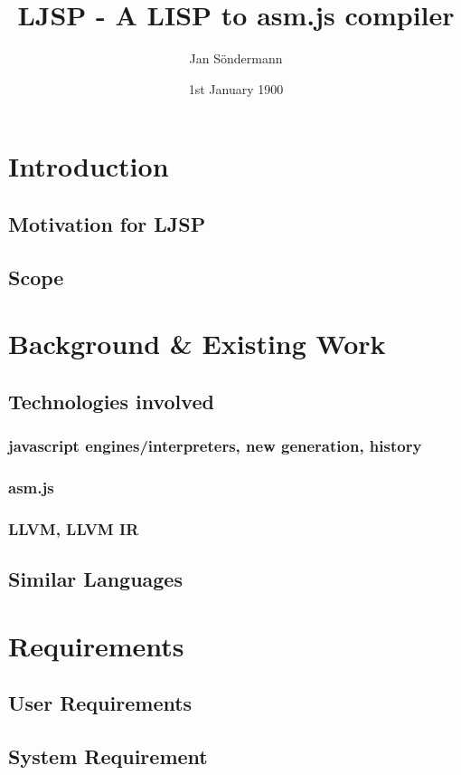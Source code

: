 \documentclass[11pt]{report}
\title{LJSP - A LISP to asm.js compiler}
\author{Jan S\"ondermann}
\date{1st January 1900}
\begin{document}
\maketitle


\tableofcontents

\chapter{Introduction}
\section{Motivation for LJSP}
\section{Scope}

\chapter{Background \& Existing Work}
\section{Technologies involved}
\subsection{javascript engines/interpreters, new generation, history}
\subsection{asm.js}
\subsection{LLVM, LLVM IR}
\section{Similar Languages}

\chapter{Requirements}
\section{User Requirements}
\section{System Requirement}
\end{document}
